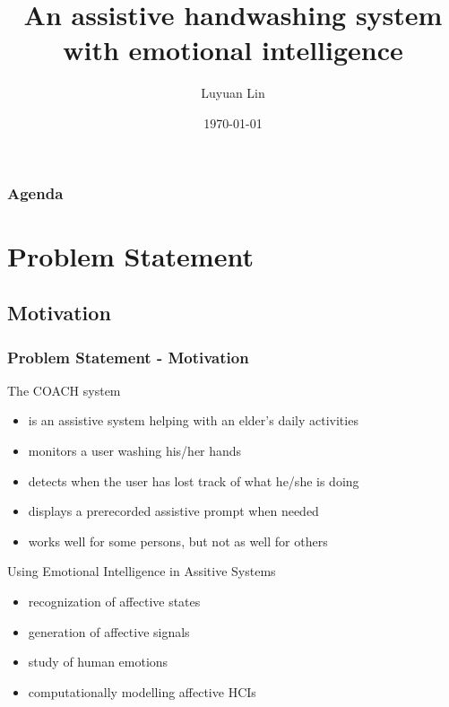 \documentclass{beamer}
\title[Master Thesis Presentation]{An assistive handwashing system with emotional intelligence}
\author{Luyuan Lin} %
\institute[UWaterloo] %
{
University of Waterloo \\ %
\medskip
\textit{Supervisor:
\newline Jesse Hoey
} %
}
\date{\today} %
\begin{document}
\begin{frame}
\titlepage %
\end{frame}

\begin{frame}
\frametitle{Agenda} %
\tableofcontents %
\end{frame}


\section{Problem Statement} 
\subsection{Motivation}
\begin{frame}
\frametitle{Problem Statement - Motivation}
The COACH system
\begin{itemize}
\item is an assistive system helping with an elder's daily activities
\item monitors a user washing his/her hands
\item detects when the user has lost track of what he/she is doing
\item displays a prerecorded assistive prompt when needed
\item works well for some persons, but not as well for others
\end{itemize}
\pause
\vspace{0.3cm}
Using Emotional Intelligence in Assitive Systems
\begin{itemize}
\pause \item recognization of affective states
\pause \item generation of affective signals
\pause \item study of human emotions
\pause \item computationally modelling affective HCIs
\end{itemize}
\end{frame}
\end{document}
